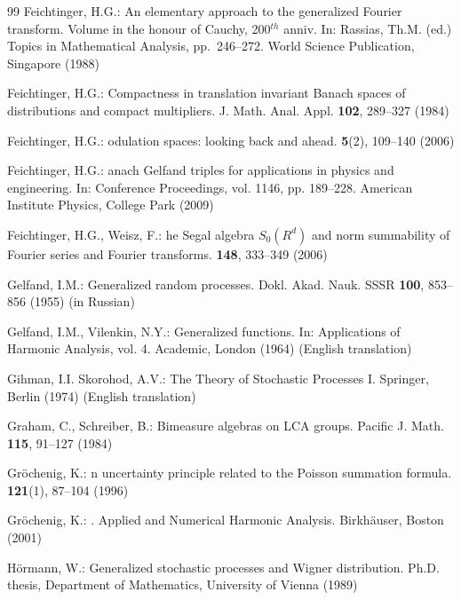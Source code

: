 \documentclass[graybox]{svmult}
\begin{document}
\begin{thebibliography}{99}
 {F}eichtinger, H.G.:  An elementary approach to the  generalized Fourier transform.  Volume in the honour of Cauchy,
   200${}^{th}$ anniv. In:   Rassias,  Th.M. (ed.) Topics in Mathematical Analysis, pp.~246--272.   World Science  Publication, Singapore (1988)

 {F}eichtinger, H.G.:  Compactness in translation
   invariant Banach spaces of distributions and compact multipliers.
   J. Math.  Anal. Appl.  {\bf 102},  289--327 (1984)

{F}eichtinger, H.G.:
odulation {s}paces: {l}ooking {b}ack and {a}head.
 {\bf 5}(2), 109--140 (2006)

{F}eichtinger, H.G.:
anach {G}elfand triples for applications in physics and
engineering.
\newblock  In: Conference Proceedings,  vol. 1146,  pp. 189--228.
American Institute Physics, College Park (2009)

{F}eichtinger, H.G.,  {W}eisz, F.:
he {S}egal algebra ${S}_0({R}^d)$ and norm summability of
{F}ourier series and {F}ourier transforms.
 {\bf 148}, 333--349 (2006)

 Gelfand, I.M.: Generalized random processes.
   Dokl.  Akad.  Nauk.  SSSR {\bf 100}, 853--856   (1955) (in Russian)

 Gelfand, I.M.,   Vilenkin, N.Y.: Generalized
   functions. In:  Applications of Harmonic Analysis, vol.  4.  Academic, London (1964) (English translation)

 Gihman, I.I.   Skorohod, A.V.: The Theory of
   Stochastic Processes I.  Springer, Berlin (1974) (English translation)

 Graham, C.,  Schreiber, B.:
Bimeasure algebras on  {LCA} groups.  Pacific  J.  Math.  {\bf 115},  91--127 (1984)

{G}r{\"o}chenig, K.:
n uncertainty principle related
to the {P}oisson summation formula.
 {\bf 121}(1), 87--104 (1996)

{G}r{\"o}chenig, K.:
.
\newblock Applied and Numerical Harmonic Analysis. {B}irkh{\"a}user,
{B}oston (2001)

 H\"ormann, W.: Generalized stochastic processes
   and Wigner distribution. Ph.D. thesis, Department of  Mathematics,
    University of Vienna (1989)


\end{thebibliography}
\end{document}
